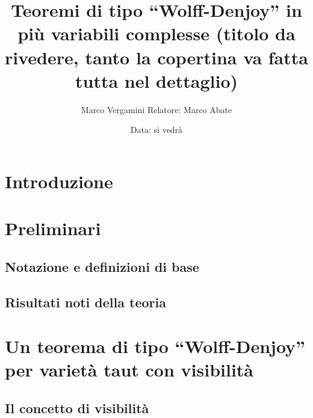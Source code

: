 \documentclass{article}
\title{Teoremi di tipo ``Wolff-Denjoy'' in più variabili complesse (titolo da rivedere, tanto la copertina va fatta tutta nel dettaglio)}
\author{Marco Vergamini Relatore: Marco Abate}
\date{Data: si vedrà}
\begin{document}
\maketitle
\newpage
\tableofcontents
\newpage


\section*{Introduzione}


\newpage

\section{Preliminari}
\subsection{Notazione e definizioni di base}

\subsection{Risultati noti della teoria}


\newpage

\section{Un teorema di tipo ``Wolff-Denjoy'' per varietà taut con visibilità}
\subsection{Il concetto di visibilità}

%
%

\newpage

%
%
%
\end{document}
